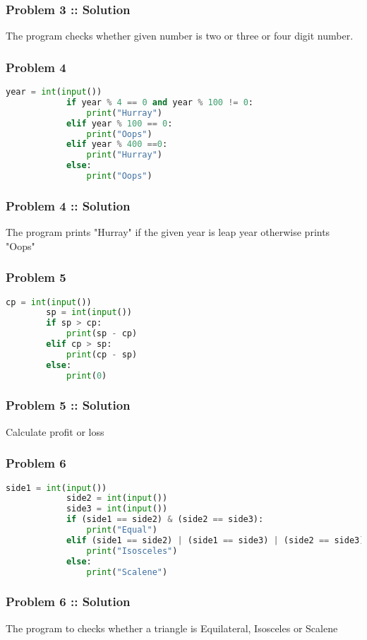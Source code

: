 \documentclass[14pt]{beamer}
\begin{document}
    \begin{frame}
        \frametitle{Problem 3 :: Solution}
        The program checks whether given number is two or three or four digit number.
    \end{frame}
    \begin{frame}[containsverbatim]
        \frametitle{Problem 4}
        \begin{lstlisting}[language=Python]
            year = int(input())
            if year % 4 == 0 and year % 100 != 0:
                print("Hurray")
            elif year % 100 == 0:
                print("Oops")
            elif year % 400 ==0:
                print("Hurray")
            else:
                print("Oops")
        \end{lstlisting}
    \end{frame}
    \begin{frame}
        \frametitle{Problem 4 :: Solution}
        The program prints "Hurray" if the given year is leap year otherwise prints "Oops"
    \end{frame}
    \begin{frame}[containsverbatim]
        \frametitle{Problem 5}
        \begin{lstlisting}[language=Python]
        cp = int(input())
        sp = int(input())
        if sp > cp:
            print(sp - cp)
        elif cp > sp:
            print(cp - sp)
        else:
            print(0)
        \end{lstlisting}
    \end{frame}
    \begin{frame}
        \frametitle{Problem 5 :: Solution}
        Calculate profit or loss
    \end{frame}
    \begin{frame}[containsverbatim]
        \frametitle{Problem 6}
        \begin{lstlisting}[language=Python]
            side1 = int(input())
            side2 = int(input())
            side3 = int(input())
            if (side1 == side2) & (side2 == side3):
                print("Equal")
            elif (side1 == side2) | (side1 == side3) | (side2 == side3):
                print("Isosceles")
            else:
                print("Scalene")
        \end{lstlisting}
    \end{frame}
    \begin{frame}
        \frametitle{Problem 6 :: Solution}
        The program to checks whether a triangle is Equilateral, Isosceles or Scalene
    \end{frame}
\end{document}
